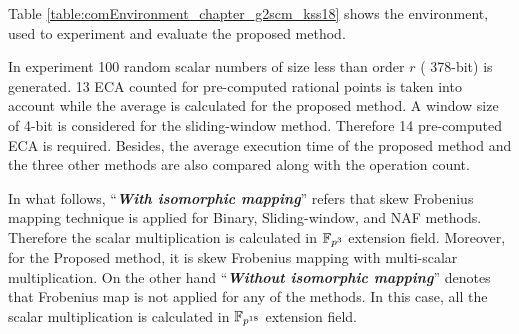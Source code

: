Table \ref{table:comEnvironment_chapter_g2scm_kss18} shows the environment, used to experiment and evaluate the proposed method.  
\renewcommand{\baselinestretch}{1.5}
\begin{table}[!ht]
	\renewcommand{\arraystretch}{1.3}
	\centering
	\caption{ Computational environment.}
	\label{table:comEnvironment_chapter_g2scm_kss18}
\end{table}
\renewcommand{\baselinestretch}{1.0}

In experiment 100 random scalar numbers of size less than order $r$ ( 378-bit) is generated.
13  ECA counted for pre-computed rational points is taken into account while the average is calculated for the proposed method.
A window size of 4-bit is considered for the sliding-window method. 
Therefore 14 pre-computed ECA is required. 
Besides, the average execution time of the proposed method and the three other methods are also compared along with the operation count.

In what follows, ``\textit{\textbf{With isomorphic mapping}}'' refers that skew Frobenius mapping technique is applied for Binary, Sliding-window, and NAF methods. Therefore the scalar multiplication is calculated in $\mathbb{F}_{p^3}$ extension field.
Moreover, for the Proposed method, it is skew Frobenius mapping with multi-scalar multiplication. 
On the other hand ``\textit{\textbf{Without isomorphic mapping}}'' denotes that Frobenius map is not applied for any of the methods.
In this case, all the scalar multiplication is calculated in $\mathbb{F}_{p^{18}}$ extension field.

